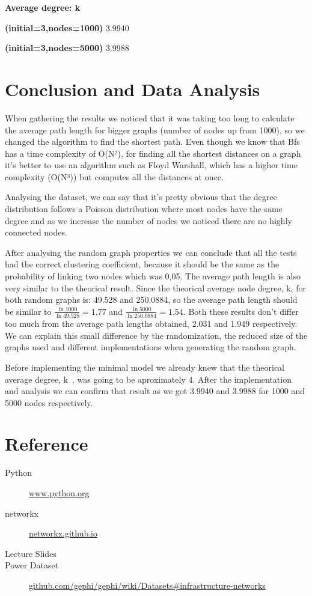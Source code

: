 \documentclass[a4paper,titlepage,11pt]{article}
\begin{document}
\begin{center}

  \textbf{Average degree: \textlangle k\textrangle}

  \textbf{(initial=3,nodes=1000)} 3.9940

  \textbf{(initial=3,nodes=5000)} 3.9988

\end{center}

\section{Conclusion and Data Analysis}
When gathering the results we noticed that it was taking too long to calculate the average path length for bigger graphs
(number of nodes up from 1000), so we changed the algorithm to find the shortest path. Even though we know that Bfs has a
time complexity of O(N²), for finding all the shortest distances on a graph it's better to use an algorithm such as Floyd Warshall,
which has a higher time complexity (O(N³)) but computes all the distances at once.

Analysing the dataset, we can say that it's pretty obvious that the degree distribution follows a Poisson distribution where most nodes
have the same degree and as we increase the number of nodes we noticed there are no highly connected nodes.

After analysing the random graph properties we can conclude that all the tests had the correct clustering coefficient, because it should
be the same as the probability of linking two nodes which was 0,05.
The average path length is also very similar to the theorical result. Since the theorical average node degree, \textlangle k\textrangle,
for both random graphs is: 49.528 and 250.0884, so the average path length should be similar to $\frac{\ln1000}{\ln49.528}=1.77$ and
$\frac{\ln5000}{\ln250.0884}=1.54$. Both these results don't differ too much from the average path lengths obtained, 2.031 and 1.949
respectively. We can explain this small difference by the randomization, the reduced size of the graphs used and different implementations
when generating the random graph.

Before implementing the minimal model we already knew that the theorical average degree, \textlangle k\textrangle \ , was going to be
aproximately 4. After the implementation and analysis we can confirm that result as we got 3.9940 and 3.9988 for 1000 and 5000 nodes respectively.

\section{Reference}
\begin{description}
  \item[Python] \href{https://www.python.org}{www.python.org}
  \item[networkx] \href{https://networkx.github.io}{networkx.github.io}
  \item[Lecture Slides]
  \item[Power Dataset] \href{https://github.com/gephi/gephi/wiki/Datasets#infrastructure-networks}{github.com/gephi/gephi/wiki/Datasets\#infrastructure-networks}
\end{description}
\end{document}

